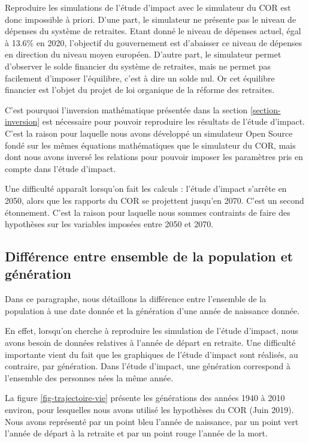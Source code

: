 \documentclass[10pt]{article}
\begin{document}
Reproduire les simulations de l'étude d'impact avec le simulateur du COR 
est donc impossible à priori. 
D'une part, le simulateur ne présente pas le niveau de dépenses du système 
de retraites. 
Etant donné le niveau de dépenses actuel, égal à 13.6\% en 2020, 
l'objectif du gouvernement est d'abaisser ce niveau de dépenses 
en direction du niveau moyen européen. 
D'autre part, le simulateur permet d'observer le solde financier du système de retraites, 
mais ne permet pas facilement d'imposer l'équilibre, c'est à dire un solde nul. 
Or cet équilibre financier est l'objet du projet de loi organique de la réforme 
des retraites. 

C'est pourquoi l'inversion mathématique présentée dans la section \ref{section-inversion} 
est nécessaire pour pouvoir reproduire les résultats de l'étude d'impact. 
C'est la raison pour laquelle nous avons développé un simulateur Open Source 
\cite{SimulateurScherrer} fondé sur les mêmes équations mathématiques 
que le simulateur du COR, mais dont nous avons inversé les relations pour 
pouvoir imposer les paramètres pris en compte dans l'étude d'impact. 

Une difficulté apparaît lorsqu'on fait les calculs : 
l'étude d'impact s'arrête en 2050, alors que les rapports du COR 
se projettent jusqu'en 2070. 
C'est un second étonnement. 
C'est la raison pour laquelle nous sommes contraints de faire des 
hypothèses sur les variables imposées entre 2050 et 2070. 


\subsection{Différence entre ensemble de la population et génération}

Dans ce paragraphe, nous détaillons la différence entre 
l'ensemble de la population à une date donnée et la génération d'une année 
de naissance donnée. 

En effet, lorsqu'on cherche à reproduire les simulation de l'étude d'impact, nous 
avons besoin de données relatives à l'année de départ en retraite. 
Une difficulté importante vient du fait que les graphiques de l'étude 
d'impact sont réalisés, au contraire, par génération. 
Dans l'étude d'impact, une génération correspond à l'ensemble des personnes 
nées la même année. 

La figure \ref{fig-trajectoire-vie} présente les générations des années 1940 
à 2010 environ, pour lesquelles nous avons utilisé les hypothèses du COR (Juin 2019).
Nous avons représenté par un point bleu l'année de naissance, par un point 
vert l'année de départ à la retraite et par un point rouge l'année de la 
mort. 
\end{document}

